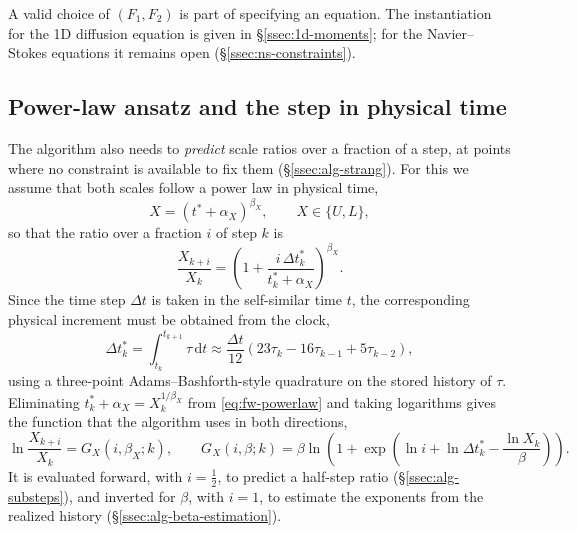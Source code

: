 A valid choice of $(F_1, F_2)$ is part of specifying an equation. The
instantiation for the 1D diffusion equation is given in
\S\ref{ssec:1d-moments}; for the Navier--Stokes equations it remains open
(\S\ref{ssec:ns-constraints}).

\subsection{Power-law ansatz and the step in physical time}\label{ssec:fw-powerlaw}

The algorithm also needs to \emph{predict} scale ratios over a fraction of a
step, at points where no constraint is available to fix them
(\S\ref{ssec:alg-strang}). For this we assume that both scales follow a power
law in physical time,
\begin{equation}\label{eq:fw-powerlaw}
  X = (t^* + \alpha_X)^{\beta_X}, \qquad X \in \{U, L\},
\end{equation}
so that the ratio over a fraction $i$ of step $k$ is
\begin{equation}\label{eq:fw-ratio}
  \frac{X_{k+i}}{X_k} = \left( 1 + \frac{i\, \Delta t_k^*}{t_k^* + \alpha_X} \right)^{\beta_X}.
\end{equation}
Since the time step $\Delta t$ is taken in the self-similar time $t$, the
corresponding physical increment must be obtained from the clock,
\begin{equation}\label{eq:fw-dtstar}
  \Delta t_k^* = \int_{t_k}^{t_{k+1}} \tau\, \mathrm{d} t
  \approx \frac{\Delta t}{12}\left( 23\tau_k - 16\tau_{k-1} + 5\tau_{k-2} \right),
\end{equation}
using a three-point Adams--Bashforth-style quadrature on the stored history of
$\tau$. Eliminating $t_k^* + \alpha_X = X_k^{1/\beta_X}$ from
\eqref{eq:fw-powerlaw} and taking logarithms gives the function that the
algorithm uses in both directions,
\begin{equation}\label{eq:fw-G}
  \ln \frac{X_{k+i}}{X_k} = G_X(i, \beta_X; k),
  \qquad
  G_X(i, \beta; k) = \beta \ln\!\left( 1 + \exp\!\left( \ln i + \ln \Delta t_k^* - \frac{\ln X_k}{\beta} \right) \right).
\end{equation}
It is evaluated forward, with $i = \tfrac12$, to predict a half-step ratio
(\S\ref{ssec:alg-substeps}), and inverted for $\beta$, with $i = 1$, to
estimate the exponents from the realized history
(\S\ref{ssec:alg-beta-estimation}).

